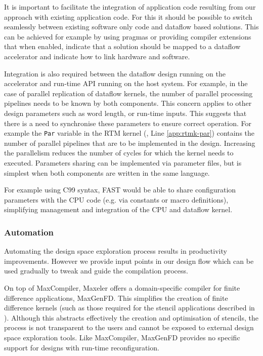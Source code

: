 It is important to facilitate the integration of application code
resulting from our approach with existing application code. For this
it should be possible to switch seamlessly between existing software
only code and dataflow based solutions. This can be achieved for
example by using pragmas or providing compiler extensions that when
enabled, indicate that a solution should be mapped to a dataflow
accelerator and indicate how to link hardware and software.

Integration is also required between the dataflow design running on
the accelerator and run-time API running on the host system. For
example, in the case of parallel replication of dataflow kernels, the
number of parallel processing pipelines needs to be known by both
components. This concern applies to other design parameters such as
word length, or run-time inputs. This suggests that there is a need to
synchronise these parameters to ensure correct operation. For example
the \texttt{Par} variable in the RTM kernel (,
Line \ref{app:rtmk-par}) contains the number of parallel pipelines
that are to be implemented in the design. Increasing the parallelism
reduces the number of cycles for which the kernel needs to executed.
Parameters sharing can be implemented via parameter files, but is
simplest when both components are written in the same language.

For example using C99 syntax, FAST would be able to share configuration
parameters with the CPU code (e.g. via constants or macro
definitions), simplifying management and integration of the CPU and
dataflow kernel.

\subsubsection{Automation}

Automating the design space exploration process results in
productivity improvements. However we provide input points in our
design flow which can be used gradually to tweak and guide the
compilation process.


On top of MaxCompiler, Maxeler offers a domain-specific compiler for
finite difference applications, MaxGenFD\cite{MaxelerFD}. This
simplifies the creation of finite difference kernels (such as those
required for the stencil applications described in
). Although this abstracts effectively the
creation and optimisation of stencils, the process is not transparent
to the users and cannot be exposed to external design space
exploration tools. Like MaxCompiler, MaxGenFD provides no specific
support for designs with run-time reconfiguration.

